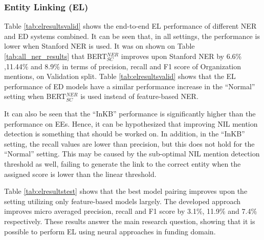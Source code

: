 \documentclass{report}
\theoremstyle{definition}
\theoremstyle{remark}
\begin{document}
\subsubsection{Entity Linking (EL)}
Table \ref{tab:elresultsvalid} shows the end-to-end EL performance of different NER and ED systems combined. It can be seen that, in all settings, the performance is lower when Stanford NER is used. It was on shown on Table \ref{tab:all_ner_results} that BERT$_{SC}^{NER}$ improves upon Stanford NER by 6.6\% ,11.44\% and 8.9\% in terms of precision, recall and F1 score of Organization mentions, on Validation split. Table \ref{tab:elresultsvalid} shows that the EL performance of ED models have a similar performance increase in the ``Normal'' setting when BERT$_{SC}^{NER}$ is used instead of feature-based NER.

It can also be seen that the ``InKB'' performance is significantly higher than the performance on EEs. Hence, it can be hypothesized that improving NIL mention detection is something that should be worked on. In addition, in the ``InKB'' setting, the recall values are lower than precision, but this does not hold for the ``Normal'' setting. This may be caused by the sub-optimal NIL mention detection threshold as well, failing to generate the link to the correct entity when the assigned score is lower than the linear threshold.

Table \ref{tab:elresultstest} shows that the best model pairing improves upon the setting utilizing only feature-based models largely. The developed approach improves micro averaged precision, recall and F1 score by 3.1\%, 11.9\% and 7.4\% respectively. These results answer the main research question, showing that it is possible to perform EL using neural approaches in funding domain.
\end{document}
